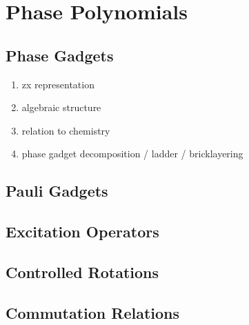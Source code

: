 \chapter{\label{ch:4-phase-polynomials}Phase Polynomials}

\section{Phase Gadgets}
\begin{enumerate}
    \item zx representation
    \item algebraic structure
    \item relation to chemistry
    \item phase gadget decomposition / ladder / bricklayering
\end{enumerate}

\section{Pauli Gadgets}
\section{Excitation Operators}
\section{Controlled Rotations}
\section{Commutation Relations}
